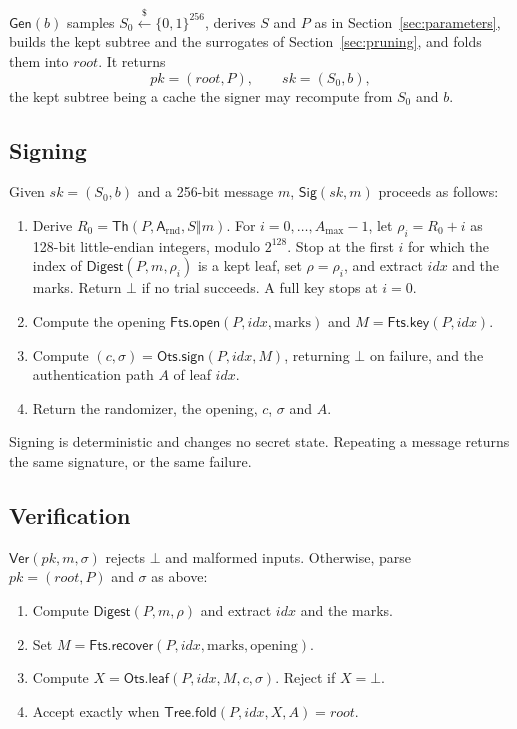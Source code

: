 \documentclass[11pt]{article}
\theoremstyle{plain}
\theoremstyle{definition}
\newcommand{\bits}[1]{\{0,1\}^{#1}}
\newcommand{\getsr}{\stackrel{\$}{\gets}}
\newcommand{\Th}{\mathsf{Th}}
\newcommand{\Digest}{\mathsf{Digest}}
\newcommand{\Gen}{\mathsf{Gen}}
\newcommand{\Sig}{\mathsf{Sig}}
\newcommand{\Ver}{\mathsf{Ver}}
\newcommand{\concat}{\mathbin\Vert}
\newcommand{\sk}{\mathit{sk}}
\newcommand{\pk}{\mathit{pk}}
\newcommand{\rootnode}{\mathit{root}}
\newcommand{\addr}{\mathsf{A}}
\newcommand{\amax}{A_{\max}}
\newcommand{\idx}{\mathit{idx}}
\newcommand{\OtsSign}{\mathsf{Ots.sign}}
\newcommand{\OtsLeaf}{\mathsf{Ots.leaf}}
\newcommand{\TreeFold}{\mathsf{Tree.fold}}
\newcommand{\FtsKey}{\mathsf{Fts.key}}
\newcommand{\FtsOpen}{\mathsf{Fts.open}}
\newcommand{\FtsRec}{\mathsf{Fts.recover}}
\begin{document}
$\Gen(b)$ samples $S_0\getsr\bits{256}$, derives $S$ and $P$ as in Section~\ref{sec:parameters}, builds the kept subtree and the surrogates of Section~\ref{sec:pruning}, and folds them into $\rootnode$. It returns
\[
  \pk=(\rootnode,P),\qquad \sk=(S_0,b),
\]
the kept subtree being a cache the signer may recompute from $S_0$ and $b$.

\subsection{Signing}
\label{sec:sign}

Given $\sk=(S_0,b)$ and a 256-bit message $m$, $\Sig(\sk,m)$ proceeds as follows:
\begin{enumerate}
\item Derive $R_0=\Th(P,\addr_{\mathrm{rnd}},S\concat m)$. For $i=0,\ldots,\amax-1$, let $\rho_i=R_0+i$ as 128-bit little-endian integers, modulo $2^{128}$. Stop at the first $i$ for which the index of $\Digest(P,m,\rho_i)$ is a kept leaf, set $\rho=\rho_i$, and extract $\idx$ and the marks. Return $\bot$ if no trial succeeds. A full key stops at $i=0$.
\item Compute the opening $\FtsOpen(P,\idx,\text{marks})$ and $M=\FtsKey(P,\idx)$.
\item Compute $(c,\sigma)=\OtsSign(P,\idx,M)$, returning $\bot$ on failure, and the authentication path $A$ of leaf $\idx$.
\item Return the randomizer, the opening, $c$, $\sigma$ and $A$.
\end{enumerate}
Signing is deterministic and changes no secret state. Repeating a message returns the same signature, or the same failure.

\subsection{Verification}
\label{sec:ver}

$\Ver(\pk,m,\sigma)$ rejects $\bot$ and malformed inputs. Otherwise, parse $\pk=(\rootnode,P)$ and $\sigma$ as above:
\begin{enumerate}
\item Compute $\Digest(P,m,\rho)$ and extract $\idx$ and the marks.
\item Set $M=\FtsRec(P,\idx,\text{marks},\text{opening})$.
\item Compute $X=\OtsLeaf(P,\idx,M,c,\sigma)$. Reject if $X=\bot$.
\item Accept exactly when $\TreeFold(P,\idx,X,A)=\rootnode$.
\end{enumerate}
\end{document}
